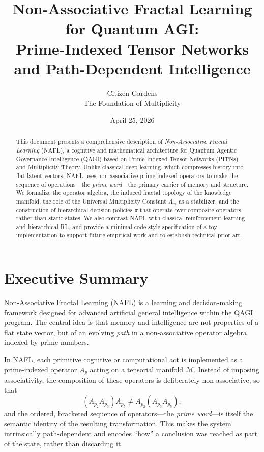 \documentclass[11pt]{article}
\title{Non-Associative Fractal Learning for Quantum AGI:\\
Prime-Indexed Tensor Networks and Path-Dependent Intelligence}
\author{Citizen Gardens \\ The Foundation of Multiplicity}
\date{April 25, 2026}
\newcommand{\Mcal}{\mathcal{M}}
\newcommand{\Lm}{\Lambda_m}
\begin{document}
\maketitle

\begin{abstract}
This document presents a comprehensive description of \emph{Non-Associative Fractal Learning} (NAFL), a cognitive and mathematical architecture for Quantum Agentic Governance Intelligence (QAGI) based on Prime-Indexed Tensor Networks (PITNs) and Multiplicity Theory.
Unlike classical deep learning, which compresses history into flat latent vectors, NAFL uses non-associative prime-indexed operators to make the sequence of operations---the \emph{prime word}---the primary carrier of memory and structure.
We formalize the operator algebra, the induced fractal topology of the knowledge manifold, the role of the Universal Multiplicity Constant \(\Lm\) as a stabilizer, and the construction of hierarchical decision policies \(\pi\) that operate over composite operators rather than static states.
We also contrast NAFL with classical reinforcement learning and hierarchical RL, and provide a minimal code-style specification of a toy implementation to support future empirical work and to establish technical prior art.
\end{abstract}
\newpage
\tableofcontents

\section{Executive Summary}

Non-Associative Fractal Learning (NAFL) is a learning and decision-making framework designed for advanced artificial general intelligence within the QAGI program.
The central idea is that memory and intelligence are not properties of a flat state vector, but of an evolving \emph{path} in a non-associative operator algebra indexed by prime numbers.

In NAFL, each primitive cognitive or computational act is implemented as a prime-indexed operator \(A_p\) acting on a tensorial manifold \(\Mcal\).
Instead of imposing associativity, the composition of these operators is deliberately non-associative, so that
\[
(A_{p_2} A_{p_3}) A_{p_5} \neq A_{p_2} (A_{p_3} A_{p_5}),
\]
and the ordered, bracketed sequence of operators---the \emph{prime word}---is itself the semantic identity of the resulting transformation.
This makes the system intrinsically path-dependent and encodes ``how'' a conclusion was reached as part of the state, rather than discarding it.
\end{document}
